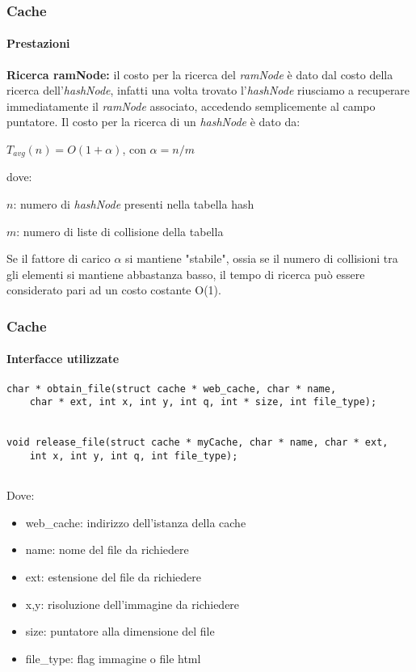 \documentclass{beamer}
\begin{document}
\begin{frame}
\frametitle{Cache}
\framesubtitle{Prestazioni}
\textbf{Ricerca ramNode:} il costo per la ricerca del \textit{ramNode} è dato dal costo della ricerca
dell'\textit{hashNode}, infatti una volta trovato l'\textit{hashNode} riusciamo a recuperare
immediatamente il \textit{ramNode} associato, accedendo semplicemente al
campo puntatore. Il costo per la ricerca di un \textit{hashNode} è dato da:

\begin{center}
$T_{avg}(n) = O(1+\alpha)$, con $\alpha = n/m$
\end{center}


dove:

\medskip

$n$: numero di \textit{hashNode} presenti nella tabella hash

$m$: numero di liste di collisione della tabella

\medskip

Se il fattore di carico $\alpha$ si mantiene "stabile", ossia se il numero di collisioni tra gli elementi si mantiene
abbastanza basso, il tempo di ricerca può essere considerato
pari ad un costo costante O(1).

\end{frame}

\begin{frame}[fragile]
\frametitle{Cache}
\framesubtitle{Interfacce utilizzate}

\tiny
\begin{lstlisting}
char * obtain_file(struct cache * web_cache, char * name,
	char * ext, int x, int y, int q, int * size, int file_type);
	
	
void release_file(struct cache * myCache, char * name, char * ext,
	int x, int y, int q, int file_type);
	
\end{lstlisting}
\normalsize

Dove:

\begin{itemize} 

\item web\_cache: indirizzo dell'istanza della cache

\item name: nome del file da richiedere

\item ext: estensione del file da richiedere

\item x,y: risoluzione dell'immagine da richiedere

\item size: puntatore alla dimensione del file

\item file\_type: flag immagine o file html


\end{itemize}





\end{frame}
\end{document}
